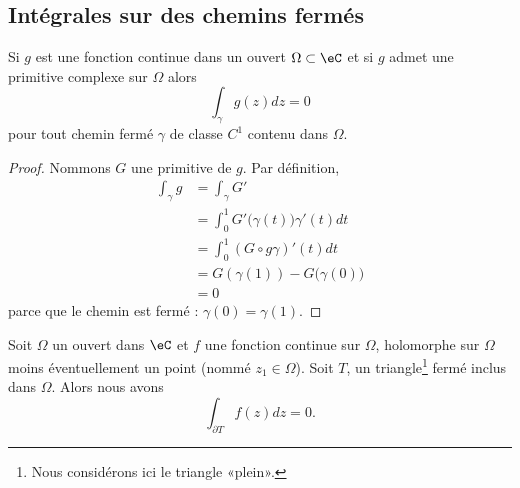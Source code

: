 \subsection{Intégrales sur des chemins fermés}

\begin{lemma}       \label{LemtpEOmi}
	Si \( g\) est une fonction continue dans un ouvert \( \Omega\subset \eC\) et si \( g\) admet une primitive complexe sur \( \Omega\) alors
	\begin{equation}
		\int_{\gamma}g(z)dz=0
	\end{equation}
	pour tout chemin fermé \( \gamma\) de classe \( C^1\) contenu dans \( \Omega\).
\end{lemma}

\begin{proof}
	Nommons \( G\) une primitive de \( g\). Par définition,
	\begin{subequations}
		\begin{align}
			\int_{\gamma}g & =\int_{\gamma}G'                             \\
			               & =\int_0^1G'\big( \gamma(t) \big)\gamma'(t)dt \\
			               & =\int_0^1 (G\circ g\gamma)'(t)dt             \\
			               & =G(\gamma(1))-G\big( \gamma(0) \big)         \\
			               & =0
		\end{align}
	\end{subequations}
	parce que le chemin est fermé : \( \gamma(0)=\gamma(1)\).
\end{proof}

\begin{lemma}  \label{LemwbwbUR}
	Soit \( \Omega\) un ouvert dans \( \eC\) et \( f\) une fonction continue sur \( \Omega\), holomorphe sur \( \Omega\) moins éventuellement un point (nommé \( z_1\in\Omega\)). Soit \( T\), un triangle\footnote{Nous considérons ici le triangle «plein».} fermé inclus dans \( \Omega\). Alors nous avons
	\begin{equation}
		\int_{\partial T}f(z)dz=0.
	\end{equation}
\end{lemma}


